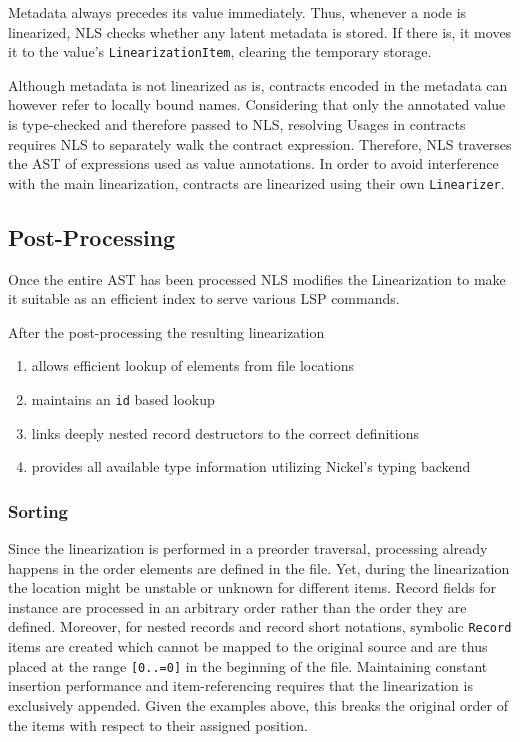 \documentclass[
  a4paper,
  bibtex,
  english,
  nomenclature]{kthlatex/kththesis/kththesis}
\providecommand{\tightlist}{%
  \setlength{\itemsep}{0pt}\setlength{\parskip}{0pt}}
\begin{document}
Metadata always precedes its value immediately. Thus, whenever a node is
linearized, NLS checks whether any latent metadata is stored. If there
is, it moves it to the value's \texttt{LinearizationItem}, clearing the
temporary storage.

Although metadata is not linearized as is, contracts encoded in the
metadata can however refer to locally bound names. Considering that only
the annotated value is type-checked and therefore passed to NLS,
resolving Usages in contracts requires NLS to separately walk the
contract expression. Therefore, NLS traverses the AST of expressions
used as value annotations. In order to avoid interference with the main
linearization, contracts are linearized using their own
\texttt{Linearizer}.

\hypertarget{sec:post-processing}{%
\subsection{Post-Processing}\label{sec:post-processing}}

Once the entire AST has been processed NLS modifies the Linearization to
make it suitable as an efficient index to serve various LSP commands.

After the post-processing the resulting linearization

\begin{enumerate}
\def\labelenumi{\arabic{enumi}.}
\tightlist
\item
  allows efficient lookup of elements from file locations
\item
  maintains an \texttt{id} based lookup
\item
  links deeply nested record destructors to the correct definitions
\item
  provides all available type information utilizing Nickel's typing
  backend
\end{enumerate}

\hypertarget{sec:sorting}{%
\subsubsection{Sorting}\label{sec:sorting}}

Since the linearization is performed in a preorder traversal, processing
already happens in the order elements are defined in the file. Yet,
during the linearization the location might be unstable or unknown for
different items. Record fields for instance are processed in an
arbitrary order rather than the order they are defined. Moreover, for
nested records and record short notations, symbolic \texttt{Record}
items are created which cannot be mapped to the original source and are
thus placed at the range \texttt{{[}0..=0{]}} in the beginning of the
file. Maintaining constant insertion performance and item-referencing
requires that the linearization is exclusively appended. Given the
examples above, this breaks the original order of the items with respect
to their assigned position.
\end{document}
